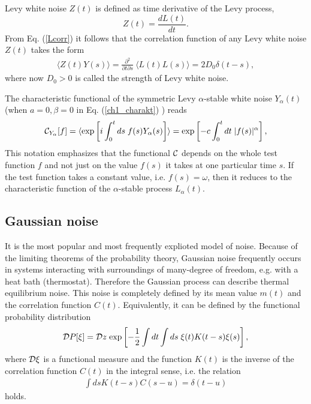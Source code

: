 \documentclass[authoryear,draft,1p,times]{elsarticle}
\newcommand{\be}{\begin{equation}}
\newcommand{\ee}{\end{equation}}
\newcommand{\bea}{\begin{eqnarray}}
\newcommand{\eea}{\end{eqnarray}}
\renewcommand{\=}{\stackrel{\mathrm{d}}{=}}
\begin{document}
Levy  white noise $Z(t)$ is  defined as time  derivative of the Levy process, 
%
\be
\label{Lwhite}
Z(t)=\frac{dL(t)}{dt}. 
\ee
%
From Eq. (\ref{Lcorr}) it follows that the   correlation function of any  Levy white 
noise $Z(t)$  takes the form 
%
\bea
\label{Ycorr}
\langle Z(t) Y(s) \rangle = \frac{\partial^2}{\partial t \partial s} \  \langle L(t) L(s) \rangle  
=  2D_0 \delta (t-s), 
\eea
% 
where   now $D_0 >0$ is called the strength of Levy  white noise.  

  The characteristic 
 functional of   the  symmetric Levy  $\alpha$-stable  white noise  $Y_{\alpha}(t)$  (when $a=0, \beta=0$ 
in Eq. (\ref{ch1_charakt}) ) reads 
%
\begin{eqnarray}
\label{whiteY}
{\cal C}_{Y_{\alpha}}[f]   =\langle {\mbox{exp}}\left[i \int_0^{t} ds\; f(s)  
Y_{\alpha}(s)  \right] \rangle = 
 {\mbox{exp}}\left[- c \int_0^{t} dt\; |f(s)|^{\alpha}   \right],
\end{eqnarray} 
%
This notation  emphasizes that the functional ${\cal C}$ depends on the whole test function $f$  
and not just on the value $f(s)$ it takes at one particular time $s$.  
If the test function takes a constant value, i.e. $f(s) =\omega$, then it reduces to the 
characteristic function of the $\alpha$-stable  process  $L_{\alpha}(t)$.  




\subsection{Gaussian noise}

It is the most popular and most frequently explioted model of noise. 
Because of the limiting theorems  of the probability theory, 
Gaussian noise frequently occurs in systems interacting with surroundings 
of many-degree of freedom, e.g. with a heat bath (thermostat). 
Therefore the Gaussian process can describe thermal equilibrium noise. 
 This noise is completely defined by 
its mean value $m(t)$  and the correlation function $C(t)$. 
Equivalently, it can be defined by the functional probability  distribution 
\cite{hibbs}
%
\begin{eqnarray}
\label{functional}
{\cal D}P[\xi] = {\cal D}z \; {\mbox{exp}}\left[-\frac{1}{2} \int dt\int ds\; 
\xi(t)  K(t-s) \xi(s) \right],
\end{eqnarray} 
%
where ${\cal D}\xi$ is a functional measure and the function $K(t)$ is 
the inverse of the correlation function $C(t)$ in the integral sense,  i.e. the relation 
%
\begin{eqnarray}
\label{inverse}
\int ds K(t-s) C(s-u) = \delta (t-u) 
\end{eqnarray} 
%
holds. 
\end{document}
